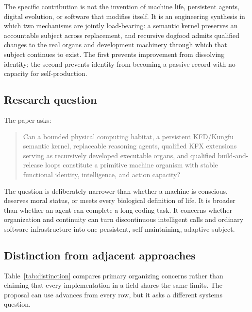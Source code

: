 The specific contribution is not the invention of machine life, persistent
agents, digital evolution, or software that modifies itself. It is an engineering
synthesis in which two mechanisms are jointly load-bearing: a semantic kernel
preserves an accountable subject across replacement, and recursive dogfood
admits qualified changes to the real organs and development machinery through
which that subject continues to exist. The first prevents improvement from
dissolving identity; the second prevents identity from becoming a passive
record with no capacity for self-production.

\subsection{Research question}

The paper asks:

\begin{quote}
Can a bounded physical computing habitat, a persistent KFD/Kungfu semantic
kernel, replaceable reasoning agents, qualified KFX extensions serving as
recursively developed executable organs, and qualified build-and-release loops
constitute a primitive machine organism with stable functional identity,
intelligence, and action capacity?
\end{quote}

The question is deliberately narrower than whether a machine is conscious,
deserves moral status, or meets every biological definition of life. It is
broader than whether an agent can complete a long coding task. It concerns
whether organization and continuity can turn discontinuous intelligent calls
and ordinary software infrastructure into one persistent, self-maintaining,
adaptive subject.

\subsection{Distinction from adjacent approaches}

Table~\ref{tab:distinction} compares primary organizing concerns rather than
claiming that every implementation in a field shares the same limits. The
proposal can use advances from every row, but it asks a different systems
question.

